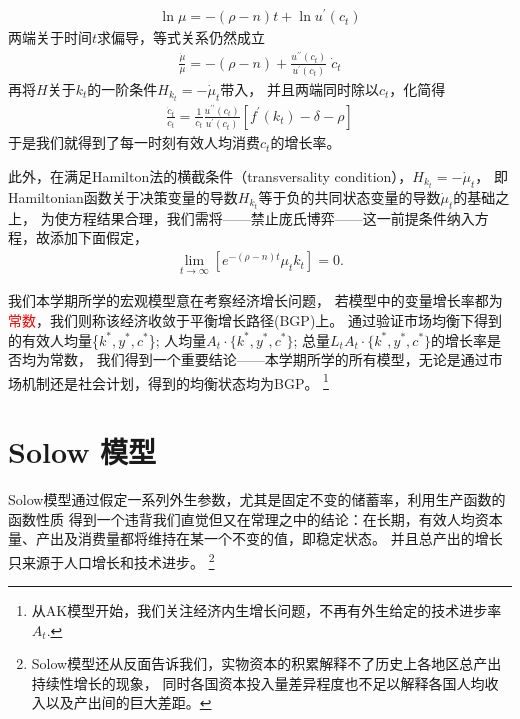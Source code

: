 \documentclass[cn,normal,11pt,black]{elegantnote}
\begin{document}
\begin{theorem}[Hamiltonian函数]
    \begin{align*}
        \ln \mu = -(\rho-n) t+\ln u^{\prime}(c_t)
    \end{align*}
    两端关于时间$t$求偏导，等式关系仍然成立
    \begin{align*}
        \frac{\dot{\mu}}{\mu}= -(\rho-n)+\frac{u^{\prime \prime}(c_t)}{u^{\prime}(c_t)} \; \dot{c}_t
    \end{align*}
    再将$H$关于$k_t$的一阶条件$H_{k_t} = - \dot{\mu}_t$带入，
    并且两端同时除以$c_t$，化简得
    \begin{align*}
        \frac{\dot{c}_t}{c_t}= \frac{1}{c_t} \frac{u^{\prime \prime}(c_t)}{u^{\prime}(c_t)} \left[f^{\prime}(k_t)-\delta-\rho\right]
    \end{align*}
    于是我们就得到了每一时刻有效人均消费$c_t$的增长率。

    此外，在满足Hamilton法的横截条件（transversality condition），$H_{k_t} = - \dot{\mu}_t$，
    即Hamiltonian函数关于决策变量的导数$H_{k_t}$等于负的共同状态变量的导数$\dot{\mu}_t$的基础之上，
    为使方程结果合理，我们需将——禁止庞氏博弈——这一前提条件纳入方程，故添加下面假定，
    \begin{align*}
        \lim _{t \rightarrow \infty} \left[e^{-(\rho-n) t} \mu_t k_t \right] = 0 .
    \end{align*}
\end{theorem}

\begin{definition}[平衡增长路径]  \label{defbgp}
    我们本学期所学的宏观模型意在考察经济增长问题，
    若模型中的变量增长率都为\textcolor{red}{常数}，我们则称该经济收敛于平衡增长路径(BGP)上。
    通过验证市场均衡下得到的有效人均量\{$k^*,y^*,c^*$\};
    人均量$A_t \cdot \{ k^*,y^*,c^* \}$;
    总量$L_t A_t \cdot \{k^*,y^*,c^* \}$的增长率是否均为常数，
    我们得到一个重要结论——本学期所学的所有模型，无论是通过市场机制还是社会计划，得到的均衡状态均为BGP。
    \footnote{从AK模型开始，我们关注经济内生增长问题，不再有外生给定的技术进步率$A_t$.}
\end{definition}    

\newpage
\section{Solow 模型}

Solow模型通过假定一系列外生参数，尤其是固定不变的储蓄率，利用生产函数的函数性质
得到一个违背我们直觉但又在常理之中的结论：在长期，有效人均资本量、产出及消费量都将维持在某一个不变的值，即稳定状态。
并且总产出的增长只来源于人口增长和技术进步。
\footnote{Solow模型还从反面告诉我们，实物资本的积累解释不了历史上各地区总产出持续性增长的现象，
同时各国资本投入量差异程度也不足以解释各国人均收入以及产出间的巨大差距。}
\end{document}
